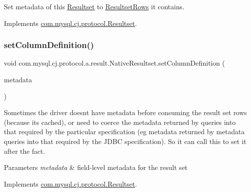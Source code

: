 Set metadata of this \mbox{\hyperlink{interfacecom_1_1mysql_1_1cj_1_1protocol_1_1_resultset}{Resultset}} to \mbox{\hyperlink{interfacecom_1_1mysql_1_1cj_1_1protocol_1_1_resultset_rows}{Resultset\+Rows}} it contains. 

Implements \mbox{\hyperlink{interfacecom_1_1mysql_1_1cj_1_1protocol_1_1_resultset_a2ee6b6a8cb5164dfc293b23cefb96b46}{com.\+mysql.\+cj.\+protocol.\+Resultset}}.

\mbox{\label{classcom_1_1mysql_1_1cj_1_1protocol_1_1a_1_1result_1_1_native_resultset_a103a093ccb3cf34125ff020ddc9ad6d8}} 
\subsubsection{\texorpdfstring{set\+Column\+Definition()}{setColumnDefinition()}}
{\footnotesize\ttfamily void com.\+mysql.\+cj.\+protocol.\+a.\+result.\+Native\+Resultset.\+set\+Column\+Definition (\begin{DoxyParamCaption}\item[{\mbox{\hyperlink{interfacecom_1_1mysql_1_1cj_1_1protocol_1_1_column_definition}{Column\+Definition}}}]{metadata }\end{DoxyParamCaption})}

Sometimes the driver doesn\textquotesingle{}t have metadata before consuming the result set rows (because it\textquotesingle{}s cached), or need to coerce the metadata returned by queries into that required by the particular specification (eg metadata returned by metadata queries into that required by the J\+D\+BC specification). So it can call this to set it after the fact.


\begin{DoxyParams}{Parameters}
{\em metadata} & field-\/level metadata for the result set \\
\hline
\end{DoxyParams}


Implements \mbox{\hyperlink{interfacecom_1_1mysql_1_1cj_1_1protocol_1_1_resultset_aee8797446404a63565e56825f2b5a5d4}{com.\+mysql.\+cj.\+protocol.\+Resultset}}.

